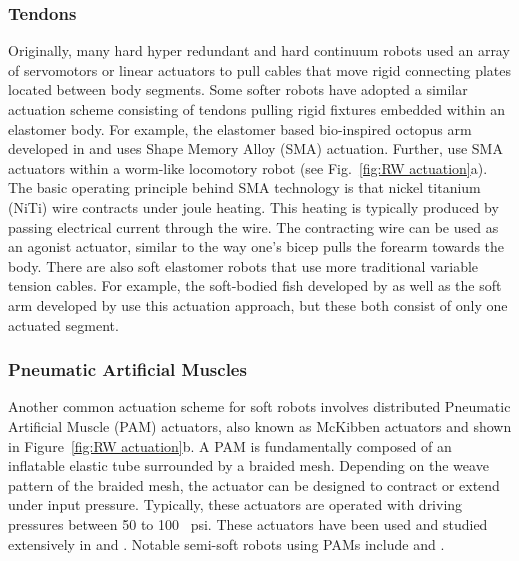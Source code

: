 \subsubsection{Tendons}
\label{subsubsec:RW Tendons}
Originally, many hard hyper redundant and hard continuum robots \citep{cieslak1999elephant, buckingham2002snake, gravagne2002uniform, hannan2003kinematics, mcmahan2005design, camarillo2009configuration} used an array of servomotors or linear actuators to pull cables that move rigid connecting plates located between body segments.
Some softer robots have adopted a similar actuation scheme consisting of tendons pulling rigid fixtures embedded within an elastomer body.
For example, the elastomer based bio-inspired octopus arm developed in  \citet{calisti2010study, laschi2012soft} and \citet{calisti2011octopus} uses Shape Memory Alloy (SMA) actuation.
Further, \citet{seok2010peristaltic} use SMA actuators within a worm-like locomotory robot (see Fig.~\ref{fig:RW actuation}a).
The basic operating principle behind SMA technology is that nickel titanium (NiTi) wire contracts under joule heating.
This heating is typically produced by passing electrical current through the wire.
The contracting wire can be used as an agonist actuator, similar to the way one's bicep pulls the forearm towards the body.
There are also soft elastomer robots that use more traditional variable tension cables.
For example, the soft-bodied fish developed by \citet{youcef2006design} as well as the soft arm developed by \citet{wang2013visual} use this actuation approach, but these both consist of only one actuated segment.

\subsubsection{Pneumatic Artificial Muscles}
\label{subsubsec:RW PMA}
Another common actuation scheme for soft robots involves distributed Pneumatic Artificial Muscle (PAM) actuators, also known as McKibben actuators and shown in Figure~\ref{fig:RW actuation}b.
A PAM is fundamentally composed of an inflatable elastic tube surrounded by a braided mesh.
Depending on the weave pattern of the braided mesh, the actuator can be designed to contract or extend under input pressure.
Typically, these actuators are operated with driving pressures between 50 to 100 ~psi.
These actuators have been used and studied extensively in \citet{chou1996measurement, tondu2000modeling} and \citet{daerden2002pneumatic}.
Notable semi-soft robots using PAMs include \citet{mcmahan2006field, pritts2004design} and \citet{kang2013design}.

